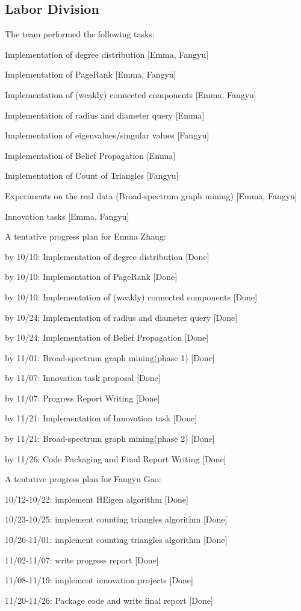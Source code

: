 
\subsection{Labor Division}

The team performed the following tasks:
\bit
\item Implementation of degree distribution [Emma, Fangyu]
\item Implementation of PageRank [Emma, Fangyu]
\item Implementation of (weakly) connected components [Emma, Fangyu]
\item Implementation of radius and diameter query [Emma]
\item Implementation of eigenvalues/singular values [Fangyu]
\item Implementation of Belief Propagation [Emma]
\item Implementation of Count of Triangles [Fangyu]
\item Experiments on the real data (Broad-spectrum graph mining) [Emma, Fangyu]
\item Innovation tasks [Emma, Fangyu]
\eit

A tentative progress plan for Emma Zhang:
\bit
\item by 10/10: Implementation of degree distribution [Done]
\item by 10/10: Implementation of PageRank [Done]
\item by 10/10: Implementation of (weakly) connected components [Done]
\item by 10/24: Implementation of radius and diameter query [Done]
\item by 10/24: Implementation of Belief Propagation [Done]
\item by 11/01: Broad-spectrum graph mining(phase 1) [Done]
\item by 11/07: Innovation task proposal [Done]
\item by 11/07: Progress Report Writing [Done]
\item by 11/21: Implementation of Innovation task [Done]
\item by 11/21: Broad-spectrum graph mining(phase 2) [Done]
\item by 11/26: Code Packaging and Final Report Writing [Done]
\eit

A tentative progress plan for Fangyu Gao:
\bit
\item 10/12-10/22: implement HEigen algorithm [Done]
\item 10/23-10/25: implement counting triangles algorithm [Done]
\item 10/26-11/01: implement counting triangles algorithm [Done]
\item 11/02-11/07: write progress report [Done]
\item 11/08-11/19: implement innovation projects [Done]
\item 11/20-11/26: Package code and write final report [Done]
\eit


